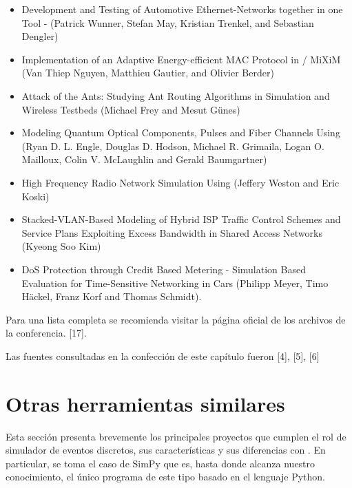 \begin{itemize}
    \item Development and Testing of Automotive Ethernet-Networks together in
one Tool - \omnetpp{} (Patrick Wunner, Stefan May, Kristian Trenkel, and
Sebastian Dengler)

    \item Implementation of an Adaptive Energy-efficient MAC Protocol in
\omnetpp{} / MiXiM (Van Thiep Nguyen, Matthieu Gautier, and Olivier Berder)

    \item Attack of the Ants: Studying Ant Routing Algorithms in Simulation and
Wireless Testbeds (Michael Frey and Mesut Günes)

    \item Modeling Quantum Optical Components, Pulses and Fiber Channels Using
\omnetpp{} (Ryan D. L. Engle, Douglas D. Hodson, Michael R. Grimaila, Logan O.
Mailloux, Colin V. McLaughlin and Gerald Baumgartner)

    \item High Frequency Radio Network Simulation Using \omnetpp{} (Jeffery
Weston and Eric Koski)

    \item Stacked-VLAN-Based Modeling of Hybrid ISP Traffic Control Schemes and
Service Plans Exploiting Excess Bandwidth in Shared Access Networks (Kyeong Soo
Kim)

    \item DoS Protection through Credit Based Metering - Simulation Based
Evaluation for Time-Sensitive Networking in Cars (Philipp Meyer, Timo Häckel,
Franz Korf and Thomas Schmidt).
\end{itemize}

Para una lista completa se recomienda visitar la página oficial de los archivos
de la conferencia. [17].

Las fuentes consultadas en la confección de este capítulo fueron [4], [5], [6]

\section{Otras herramientas similares}

Esta sección presenta brevemente los principales proyectos que cumplen el rol
de simulador de eventos discretos, sus características y sus diferencias con
\omnetpp{}. En particular, se toma el caso de SimPy que es, hasta donde alcanza
nuestro conocimiento, el único programa de este tipo basado en el lenguaje
Python.

